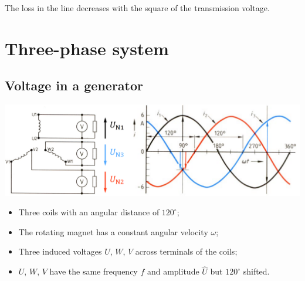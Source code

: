 \documentclass{article}
\begin{document}

The loss in the line decreases with the square of the transmission voltage.

\section{Three-phase system}
\subsection{Voltage in a generator}
\begin{center}
    \includegraphics[width=.9\textwidth]{media/generator.png}
\end{center}
\begin{itemize}
    \item Three coils with an angular distance of $120^{\circ}$;
    \item The rotating magnet has a constant angular velocity $\omega$;
    \item Three induced voltages $U$, $W$, $V$ across terminals of the coils;
    \item $U$, $W$, $V$ have the same frequency $f$ and amplitude $\widehat{U}$ but $120^{\circ}$ shifted.
\end{itemize}
\end{document}
